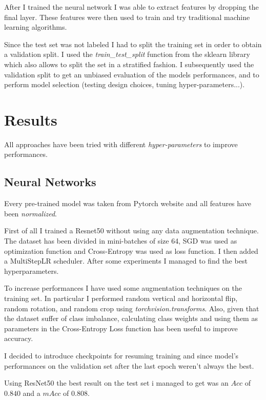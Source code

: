 \documentclass[10pt,twocolumn,letterpaper]{article}
\begin{document}
After I trained the neural network I was able to extract features by dropping the final layer. These features were then used to train and try traditional machine learning algorithms.

Since the test set was not labeled I had to split the training set in order to obtain a validation split. I used the \textit{train\_test\_split} function from the sklearn library\cite{scikit-learn} which also allows to split the set in a stratified fashion. I subsequently used the validation split to get an unbiased evaluation of the models performances, and to perform model selection (testing design choices, tuning hyper-parameters...).


\section{Results}

All approaches have been tried with different \textit{hyper-parameters} to improve performances.

\subsection{Neural Networks}

Every pre-trained model was taken from Pytorch website\cite{pytorch-models} and all features have been \textit{normalized}.

First of all I trained a Resnet50 without using any data augmentation technique. The dataset has been divided in mini-batches of size 64,
SGD was used as optimization function and Cross-Entropy was used as loss function. I then added a MultiStepLR scheduler. After some experiments I managed to find the best hyperparameters. 

To increase performances I have used some augmentation techniques on the training set. In particular I performed random vertical and horizontal flip, random rotation, and random crop using \textit{torchvision.transforms}\cite{torchvision-transforms}. Also, given that the dataset suffer of class imbalance, calculating class weights and using them as parameters in the Cross-Entropy Loss function has been useful to improve accuracy.

I decided to introduce checkpoints\cite{pytorch-checkpoints} for resuming training and since model’s performances on the validation set after the last epoch weren’t always the best.

Using ResNet50 the best result on the test set i managed to get was an $Acc$ of $0.840$ and a $mAcc$ of $0.808$.
\end{document}

